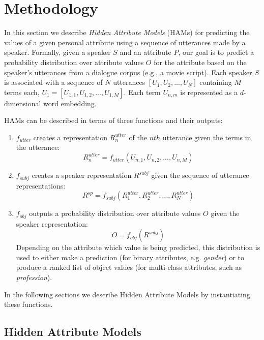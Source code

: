 \section{Methodology}
\label{sec:method}

In this section we describe \textit{Hidden Attribute Models} (HAMs) 
for predicting the values of a given personal attribute using a sequence of utterances made by a speaker.
Formally, given a speaker $S$ and an attribute $P$, our goal is to predict a probability distribution over attribute values $O$ for the attribute based on the speaker's utterances from a dialogue corpus (e.g., a movie script). Each speaker $S$ is associated with a sequence of $N$ utterances $[U_{1}, U_{2}, ..., U_{N}]$ containing $M$ terms each, $U_1 = [U_{1,1}, U_{1,2}, ..., U_{1,M}]$. Each term $U_{n,m}$ is represented as a $d$-dimensional word embedding.

HAMs
can be described in terms of three functions and their outputs:
\begin{enumerate}
\item $f_{utter}$ creates a representation $R^{utter}_n$  of the $nth$ utterance given the terms in the utterance:
\begin{equation}
R^{utter}_n = f_{utter}(U_{n,1}, U_{n,2}, ..., U_{n,M})
\end{equation}
\item $f_{subj}$ creates a speaker representation $R^{subj}$ given the sequence of utterance representations:
\begin{equation}
R^{sp} = f_{subj}(R^{utter}_1, R^{utter}_2, ..., R^{utter}_N)
\end{equation}
\item $f_{obj}$ outputs a probability distribution over attribute values $O$ given the speaker representation:
\begin{equation}
O = f_{obj}(R^{subj})
\end{equation}
Depending on the attribute which value is being predicted, this distribution is used to either make a prediction (for binary attributes, e.g. \textit{gender}) or to produce a ranked list of object values (for multi-class attributes, such as \textit{profession}).
\end{enumerate}

\noindent
In the following sections we describe Hidden Attribute Models by instantiating these functions.

\subsection{Hidden Attribute Models}


